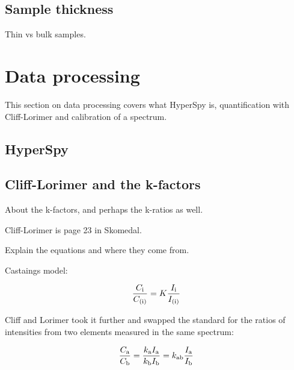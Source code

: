 \subsection{Sample thickness}
\label{sec:theory:empirical:samplethickness}
Thin vs bulk samples.








\section{Data processing}
\label{sec:theory:data}

This section on data processing covers what HyperSpy is, quantification with Cliff-Lorimer and calibration of a spectrum.


\subsection{HyperSpy}
\label{sec:theory:data:hyperspy}





%
% 
\subsection{Cliff-Lorimer and the k-factors}
\label{sec:theory:empirical:kfactors}
About the k-factors, and perhaps the k-ratios as well.

Cliff-Lorimer is page 23 in Skomedal.

Explain the equations and where they come from.

Castaings model:

\begin{equation}
    \frac{C_\textnormal{i}}{C_\textnormal{(i)}} = K \frac{I_\textnormal{i}}{I_\textnormal{(i)}}
\end{equation}

Cliff and Lorimer took it further and swapped the standard for the ratios of intensities from two elements measured in the same spectrum:

\begin{equation}
    \frac{C_\textnormal{a}}{C_\textnormal{b}} = \frac{k_\textnormal{a} I_\textnormal{a}}{k_\textnormal{b} I_\textnormal{b}} = k_\textnormal{ab}  \frac{I_\textnormal{a}}{I_\textnormal{b}}
\end{equation}



